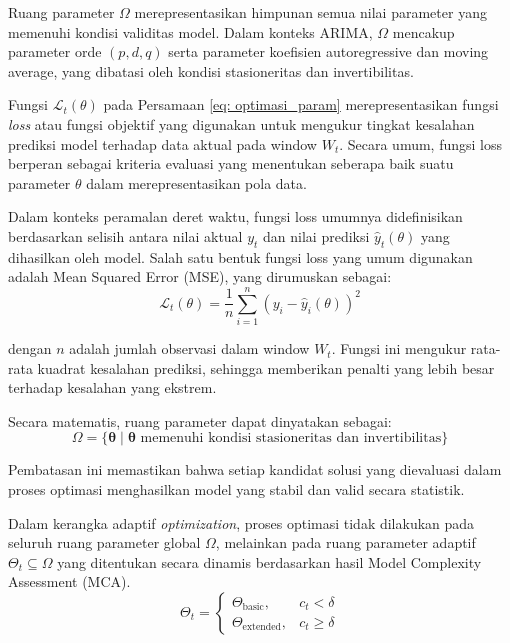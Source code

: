 Ruang parameter $\Omega$ merepresentasikan himpunan semua nilai parameter yang memenuhi kondisi validitas model. Dalam konteks ARIMA, $\Omega$ mencakup parameter orde $(p,d,q)$ serta parameter koefisien autoregressive dan moving average, yang dibatasi oleh kondisi stasioneritas dan invertibilitas.

Fungsi $\mathcal{L}_t(\theta)$ pada Persamaan \eqref{eq: optimasi_param} merepresentasikan fungsi \textit{loss} atau fungsi objektif yang digunakan untuk mengukur tingkat kesalahan prediksi model terhadap data aktual pada window $W_t$. Secara umum, fungsi loss berperan sebagai kriteria evaluasi yang menentukan seberapa baik suatu parameter $\theta$ dalam merepresentasikan pola data.

Dalam konteks peramalan deret waktu, fungsi loss umumnya didefinisikan berdasarkan selisih antara nilai aktual $y_t$ dan nilai prediksi $\hat{y}_t(\theta)$ yang dihasilkan oleh model. Salah satu bentuk fungsi loss yang umum digunakan adalah Mean Squared Error (MSE), yang dirumuskan sebagai:
\begin{equation}
\mathcal{L}_t(\theta) = \frac{1}{n} \sum_{i=1}^{n} \left(y_i - \hat{y}_i(\theta)\right)^2
\label{eq:fungsi loss}
\end{equation}

\noindent dengan $n$ adalah jumlah observasi dalam window $W_t$. Fungsi ini mengukur rata-rata kuadrat kesalahan prediksi, sehingga memberikan penalti yang lebih besar terhadap kesalahan yang ekstrem.


\noindent Secara matematis, ruang parameter dapat dinyatakan sebagai:
\begin{equation}
    \Omega  = \{ \boldsymbol{\theta} \mid \boldsymbol{\theta} \text{ memenuhi kondisi stasioneritas dan invertibilitas} \}
\end{equation}

Pembatasan ini memastikan bahwa setiap kandidat solusi yang dievaluasi dalam proses optimasi menghasilkan model yang stabil dan valid secara statistik.

Dalam kerangka adaptif \textit{optimization}, proses optimasi tidak dilakukan pada seluruh ruang parameter global $\Omega$, melainkan pada ruang parameter adaptif $\Theta_t \subseteq \Omega$ yang ditentukan secara dinamis berdasarkan hasil Model Complexity Assessment (MCA).
\begin{equation}
    \Theta_t =
    \begin{cases}
    \Theta_{\text{basic}}, & c_t < \delta \\
    \Theta_{\text{extended}}, & c_t \geq \delta
    \end{cases}
    \label{eq: MCA}
\end{equation}

